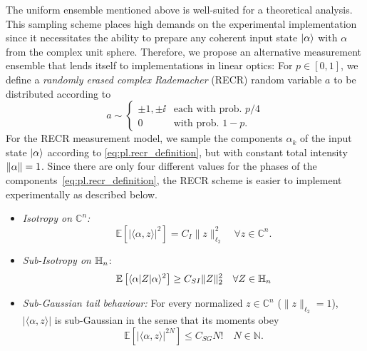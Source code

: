 The uniform ensemble mentioned above is well-suited for a theoretical analysis.
This sampling scheme places high demands on the experimental implementation since it necessitates the ability to prepare any coherent input state $\ket{ \alpha}$ with $\alpha$ from the complex unit sphere.
Therefore, we propose an alternative measurement ensemble that lends itself to implementations in linear optics:
For $p \in [0,1]$, we define a \emph{randomly erased complex Rademacher} (RECR) random variable $a$ to be distributed according to
\[
  a \sim
  \begin{cases}
    \pm 1, \pm \ii & \textrm{each with prob. } p/4 \\
    0 & \textrm{with prob. } 1 - p.
  \end{cases}
  \label{eq:pl.recr_definition}
\]
For the RECR measurement model, we sample the components $\alpha_k$ of the input state $\ket{ \alpha}$ according to \cref{eq:pl.recr_definition}, but with constant total intensity ${\Vert\alpha\Vert} = 1$.
Since there are only four different values for the phases of the components~\eqref{eq:pl.recr_definition}, the RECR scheme is easier to implement experimentally as described below.

\begin{itemize}
\item \emph{Isotropy on $\mathbb{C}^n$:}
\[
  \mathbb{E} \left[ | \langle \alpha,  z \rangle |^2 \right] = C_I \|  z \|_{\ell_2}^2 \quad \forall  z \in \mathbb{C}^n.
  \label{eq:tight_frame}
\]

\item \emph{Sub-Isotropy on $\mathbb{H}_n$}:
\begin{align}
  \mathbb{E} \left[ \langle \alpha |  Z | \alpha \rangle^2 \right] \geq C_{SI} \|  Z \|_2^2 \quad \forall  Z \in \mathbb{H}_n \label{eq:sub_isotropy}
\end{align}

\item \emph{Sub-Gaussian tail behaviour:} For every normalized $ z \in \mathbb{C}^n$ ($\|  z \|_{\ell_2}=1$), $| \langle \alpha,  z \rangle|$ is sub-Gaussian in the sense that its moments obey
\[
  \mathbb{E} \left[ | \langle \alpha,  z \rangle|^{2N} \right] \leq C_{SG} N! \quad N \in \mathbb{N}.
\label{eq:subexponential}
\]
\end{itemize}


